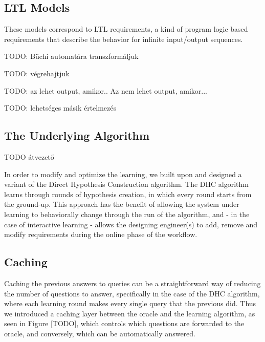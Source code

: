 \subsection{LTL Models} \label{subs_ltlintheframework}

These models correspond to LTL requirements, a kind of program logic based requirements that describe the behavior for infinite input/output sequences.

TODO: Büchi automatára transzformáljuk

TODO: végrehajtjuk

TODO: az lehet output, amikor.. Az nem lehet output, amikor...

TODO: lehetséges másik értelmezés

\subsection{The Underlying Algorithm} \label{subs_dhcintheframework}
TODO átvezető

In order to modify and optimize the learning, we built upon and designed a variant of the Direct Hypothesis Construction algorithm. The DHC algorithm learns through rounds of hypothesis creation, in which every round starts from the ground-up. This approach has the benefit of allowing the system under learning to behaviorally change through the run of the algorithm, and - in the case of interactive learning - allows the designing engineer(s) to add, remove and modify requirements during the online phase of the workflow.

\subsection{Caching} \label{subs_cachingintheframework}
Caching the previous answers to queries can be a straightforward way of reducing the number of questions to answer, specifically in the case of the DHC algorithm, where each learning round makes every single query that the previous did. Thus we introduced a caching layer between the oracle and the learning algorithm, as seen in Figure [TODO], which controls which questions are forwarded to the oracle, and conversely, which can be automatically answered.

